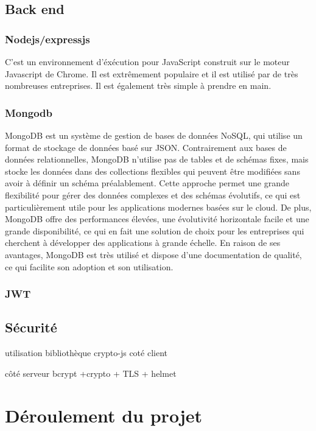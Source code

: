\documentclass[a4paper,12pt]{report}
\begin{document}
\section{Back end}

\subsection{Nodejs/expressjs}
C'est un environnement d'éxécution pour JavaScript construit sur le moteur Javascript de Chrome. Il est extrêmement populaire et il est utilisé par de très nombreuses entreprises. Il est également très simple à prendre en main.

\subsection{Mongodb}
MongoDB est un système de gestion de bases de données NoSQL, qui utilise un format de stockage de données basé sur JSON. Contrairement aux bases de données relationnelles, MongoDB n'utilise pas de tables et de schémas fixes, mais stocke les données dans des collections flexibles qui peuvent être modifiées sans avoir à définir un schéma préalablement.
Cette approche permet une grande flexibilité pour gérer des données complexes et des schémas évolutifs, ce qui est particulièrement utile pour les applications modernes basées sur le cloud. De plus, MongoDB offre des performances élevées, une évolutivité horizontale facile et une grande disponibilité, ce qui en fait une solution de choix pour les entreprises qui cherchent à développer des applications à grande échelle.
En raison de ses avantages, MongoDB est très utilisé et dispose d'une documentation de qualité, ce qui facilite son adoption et son utilisation.

\subsection{JWT}

\section{Sécurité}

utilisation bibliothèque crypto-js coté client

côté serveur bcrypt +crypto + TLS + helmet

\chapter{Déroulement du projet}
\end{document}
